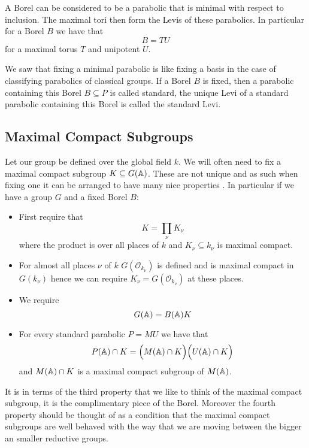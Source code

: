     
    A Borel can be considered to be a parabolic that is minimal with respect to inclusion. The maximal tori then form the Levis of these parabolics. In particular for a Borel \(B\) we have that 
    \[B = TU\]
    for a maximal torus \(T\) and unipotent \(U\).

    We saw that fixing a minimal parabolic is like fixing a basis in the case of classifying parabolics of classical groups. If a Borel \(B\) is fixed, then a parabolic containing this Borel \(B\subseteq P\) is called standard, the unique Levi of a standard parabolic containing this Borel is called the standard Levi.

    \subsection{Maximal Compact Subgroups}
    Let our group be defined over the global field \(k\). We will often need to fix a maximal compact subgroup \(K\subseteq G(\A)\). These are not unique and as such when fixing one it can be arranged to have many nice properties \cite[I.1.4]{moeglinSpectralDecompositionEisenstein1995}. In particular if we have a group \(G\) and a fixed Borel \(B\):
    \begin{itemize}
        \item First require that 
        \[K = \prod_\nu K_\nu\]
        where the product is over all places of \(k\) and \(K_\nu\subseteq k_\nu\) is maximal compact. 
        \item For almost all places \(\nu\) of \(k\) \(G(\mathcal{O}_{k_\nu})\) is defined and is maximal compact in \(G(k_\nu)\) hence we can require \(K_\nu = G(\mathcal{O}_{k_\nu})\) at these places. 
        \item We require 
        \[G(\A) = B(\A)K\]
        \item For every standard parabolic \(P = MU\) we have that 
        \[P(\A)\cap K = \Bigl( M(\A)\cap K \Bigr) \Bigl( U(\A)\cap K \Bigr)\]
        and \(M(\A)\cap K\) is a maximal compact subgroup of \(M(\A)\).
    \end{itemize}
     It is in terms of the third property that we like to think of the maximal compact subgroup, it is the complimentary piece of the Borel. Moreover the fourth property should be thought of as a condition that the maximal compact subgroups are well behaved with the way that we are moving between the bigger an smaller reductive groups.
    
